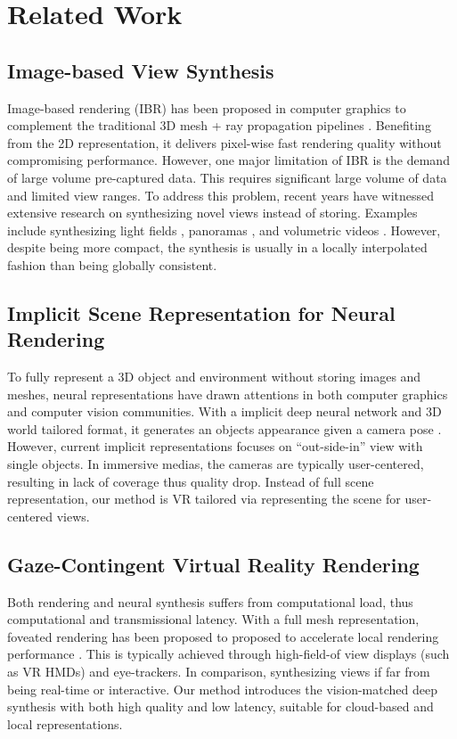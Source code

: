 \section{Related Work}
\label{sec:prior}

\subsection{Image-based View Synthesis}
Image-based rendering (IBR) has been proposed in computer graphics to complement the traditional 3D mesh + ray propagation pipelines \cite{levoy1996light,gortler1996lumigraph}. Benefiting from the 2D representation, it delivers pixel-wise fast rendering quality without compromising performance. However, one major limitation of IBR is the demand of large volume pre-captured data. This requires significant large volume of data and limited view ranges. 
To address this problem, recent years have witnessed extensive research on synthesizing novel views instead of storing. Examples include synthesizing light fields \cite{LearningViewSynthesis}, panoramas \cite{Lin:DeepPanorama}, and volumetric videos \cite{Broxton:immersiveLF}. However, despite being more compact, the synthesis is usually in a locally interpolated fashion than being globally consistent.

\subsection{Implicit Scene Representation for Neural Rendering}
To fully represent a 3D object and environment without storing images and meshes, neural representations have drawn attentions in both computer graphics and computer vision communities. With a implicit deep neural network and 3D world tailored format, it generates an objects appearance given a camera pose \cite{sitzmann2019deepvoxels,sitzmann2019srns,sitzmann2019siren,mildenhall2020nerf}. 
However, current implicit representations focuses on ``out-side-in'' view with single objects. In immersive medias, the cameras are typically user-centered, resulting in lack of coverage thus quality drop. Instead of full scene representation, our method is VR tailored via representing the scene for user-centered views.

\subsection{Gaze-Contingent Virtual Reality Rendering}
Both rendering and neural synthesis suffers from computational load, thus computational and transmissional latency.
With a full mesh representation, foveated rendering has been proposed to proposed to accelerate local rendering performance \cite{Guenter:2012:F3G,Patney:2016:TFR,Sun:2017:PGF,Kaplanyan:2019:DNR}. This is typically achieved through high-field-of view displays (such as VR HMDs) and eye-trackers. 
In comparison, synthesizing views if far from being real-time or interactive. Our method introduces the vision-matched deep synthesis with both high quality and low latency, suitable for cloud-based and local representations.
